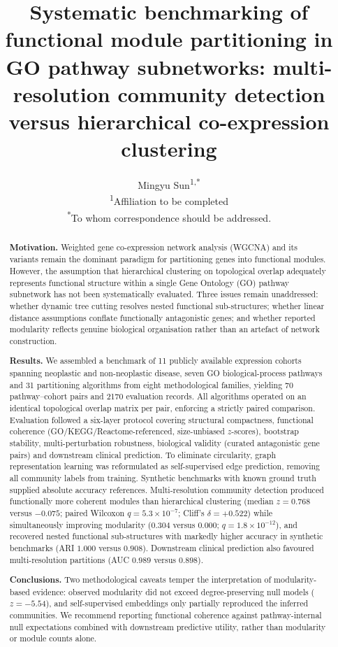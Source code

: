 \documentclass[twocolumn,11pt]{article}
\title{\vspace{-1.2cm}\bfseries Systematic benchmarking of functional module partitioning
in GO pathway subnetworks: multi-resolution community detection versus
hierarchical co-expression clustering}
\author{Mingyu Sun\textsuperscript{1,*}\\[2pt]
\small \textsuperscript{1}Affiliation to be completed\\
\small \textsuperscript{*}To whom correspondence should be addressed.}
\date{}
\begin{document}
\maketitle

\begin{abstract}
\noindent\textbf{Motivation.} Weighted gene co-expression network analysis (WGCNA) and its
variants remain the dominant paradigm for partitioning genes into functional modules.
However, the assumption that hierarchical clustering on topological overlap adequately
represents functional structure within a single Gene Ontology (GO) pathway subnetwork has
not been systematically evaluated. Three issues remain unaddressed: whether dynamic tree
cutting resolves nested functional sub-structures; whether linear distance assumptions
conflate functionally antagonistic genes; and whether reported modularity reflects genuine
biological organisation rather than an artefact of network construction.

\vspace{4pt}
\noindent\textbf{Results.} We assembled a benchmark of 11 publicly available expression
cohorts spanning neoplastic and non-neoplastic disease, seven GO biological-process
pathways and 31 partitioning algorithms from eight methodological families, yielding 70
pathway--cohort pairs and 2170 evaluation records. All algorithms operated on an identical
topological overlap matrix per pair, enforcing a strictly paired comparison. Evaluation
followed a six-layer protocol covering structural compactness, functional coherence
(GO/KEGG/Reactome-referenced, size-unbiased $z$-scores), bootstrap stability,
multi-perturbation robustness, biological validity (curated antagonistic gene pairs) and
downstream clinical prediction. To eliminate circularity, graph representation learning was
reformulated as self-supervised edge prediction, removing all community labels from
training. Synthetic benchmarks with known ground truth supplied absolute accuracy
references. Multi-resolution community detection produced functionally more coherent
modules than hierarchical clustering (median $z = 0.768$ versus $-0.075$; paired Wilcoxon
$q = 5.3\times10^{-7}$; Cliff's $\delta = +0.522$) while simultaneously improving modularity
($0.304$ versus $0.000$; $q = 1.8\times10^{-12}$), and recovered nested functional
sub-structures with markedly higher accuracy in synthetic benchmarks (ARI $1.000$ versus
$0.908$). Downstream clinical prediction also favoured multi-resolution partitions
(AUC $0.989$ versus $0.898$).

\vspace{4pt}
\noindent\textbf{Conclusions.} Two methodological caveats temper the interpretation of
modularity-based evidence: observed modularity did not exceed degree-preserving null models
($z = -5.54$), and self-supervised embeddings only partially reproduced the inferred
communities. We recommend reporting functional coherence against pathway-internal null
expectations combined with downstream predictive utility, rather than modularity or module
counts alone.


\end{abstract}
\end{document}
